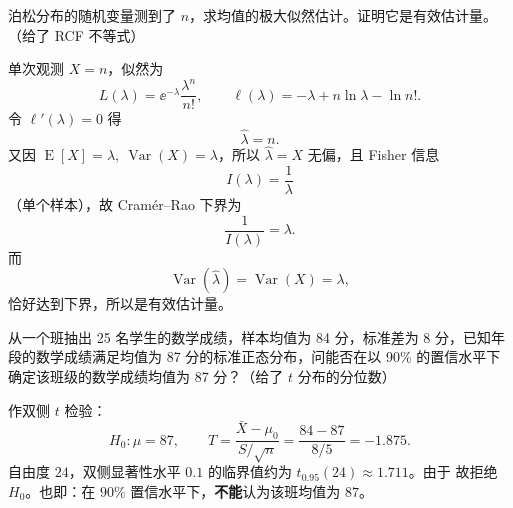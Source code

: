 \begin{question}
泊松分布的随机变量测到了 $n$，求均值的极大似然估计。证明它是有效估计量。（给了 RCF 不等式）
\begin{solution}
单次观测 $X=n$，似然为
\[
L(\lambda)=\ee^{-\lambda}\frac{\lambda^n}{n!},
\qquad
\ell(\lambda)=-\lambda+n\ln\lambda-\ln n!.
\]
令 $\ell'(\lambda)=0$ 得
\[
\hat\lambda=n.
\]
又因 $\operatorname{E}[X]=\lambda,\ \operatorname{Var}(X)=\lambda$，所以 $\hat\lambda=X$ 无偏，且 Fisher 信息
\[
I(\lambda)=\frac{1}{\lambda}
\]
（单个样本），故 Cram\'er--Rao 下界为
\[
\frac{1}{I(\lambda)}=\lambda.
\]
而
\[
\operatorname{Var}(\hat\lambda)=\operatorname{Var}(X)=\lambda,
\]
恰好达到下界，所以是有效估计量。
\end{solution}
\end{question}

\begin{question}
从一个班抽出 25 名学生的数学成绩，样本均值为 84 分，标准差为 8 分，已知年段的数学成绩满足均值为 87 分的标准正态分布，问能否在以 90\% 的置信水平下确定该班级的数学成绩均值为 87 分？（给了 $t$ 分布的分位数）
\begin{solution}
作双侧 $t$ 检验：
\[
H_0:\mu=87,\qquad
T=\frac{\bar X-\mu_0}{S/\sqrt n}
=\frac{84-87}{8/5}=-1.875.
\]
自由度 $24$，双侧显著性水平 $0.1$ 的临界值约为 $t_{0.95}(24)\approx 1.711$。由于
故拒绝 $H_0$。也即：在 $90\%$ 置信水平下，\textbf{不能}认为该班均值为 $87$。

\end{solution}
\end{question}

